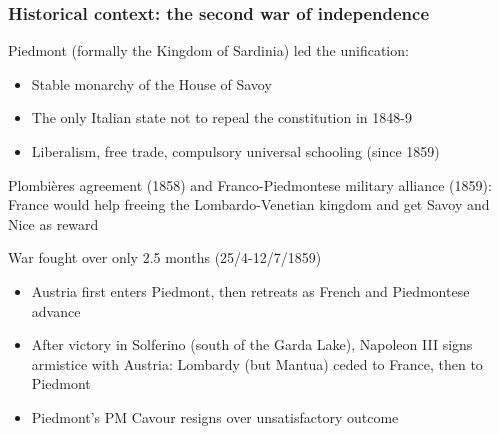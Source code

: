 \documentclass[10pt]{beamer}
\begin{document}
\begin{frame}
    \frametitle{Historical context: the second war of independence}
    
    Piedmont (formally the Kingdom of Sardinia) led the unification:
    \begin{itemize}
        \item Stable monarchy of the House of Savoy
        \item The only Italian state not to repeal the constitution in 1848-9
        \item Liberalism, free trade, compulsory universal schooling (since 1859)
    \end{itemize}

    \pause
    
    \bigskip

    Plombières agreement (1858) and Franco-Piedmontese military alliance (1859): France would help freeing the Lombardo-Venetian kingdom and get Savoy and Nice as reward

    \bigskip
    War fought over only 2.5 months (25/4-12/7/1859)
    \begin{itemize}
        \item Austria first enters Piedmont, then retreats as French and Piedmontese advance
        \item After victory in Solferino (south of the Garda Lake), Napoleon III signs armistice with Austria: Lombardy (but Mantua) ceded to France, then to Piedmont
        \item Piedmont's PM Cavour resigns over unsatisfactory outcome
    \end{itemize}
    
\end{frame}
\end{document}
